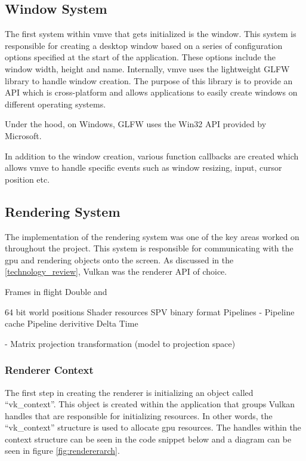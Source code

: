\documentclass[11pt]{article}
\begin{document}
  

\subsection{Window System}
The first system within \gls{vmve} that gets initialized is the window. This system is
responsible for creating a desktop window based on a series of configuration
options specified at the start of the application. These options include the
window width, height and name. Internally, \gls{vmve} uses the lightweight GLFW
library to handle window creation. The purpose of this library is to provide an
API which is cross-platform and allows applications to easily create windows on
different operating systems. 

Under the hood, on Windows, GLFW uses the Win32 API provided by Microsoft.

In addition to the window creation, various function callbacks are created
which allows \gls{vmve} to handle specific events such as window resizing, input,
cursor position etc.

\subsection{Rendering System}
The implementation of the rendering system was one of the key areas worked on
throughout the project. This system is responsible for communicating with the
\gls{gpu} and rendering objects onto the screen. As discussed in the
\ref{technology_review}, Vulkan was the renderer API of choice. 

    Frames in flight 
    Double and

64 bit world positions 
Shader resources SPV binary format 
    Pipelines
-   Pipeline cache 
Pipeline derivitive 
Delta Time

- Matrix projection transformation (model to projection space)


\subsubsection{Renderer Context}
The first step in creating the renderer is initializing an object called
``vk\_context''. This object is created within the application that groups Vulkan
handles that are responsible for initializing resources. In other words, the
``vk\_context'' structure is used to allocate \gls{gpu} resources. The handles
within the context structure can be seen in the code snippet below and a diagram
can be seen in figure \ref{fig:rendererarch}.
\end{document}
